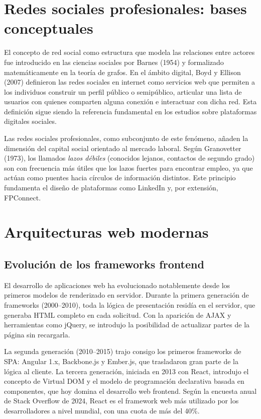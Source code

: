 \documentclass[a4paper]{report}
\begin{document}
\section{Redes sociales profesionales: bases conceptuales}

El concepto de red social como estructura que modela las relaciones entre actores fue introducido en las ciencias sociales por Barnes (1954) y formalizado matemáticamente en la teoría de grafos. En el ámbito digital, Boyd y Ellison (2007) definieron las redes sociales en internet como servicios web que permiten a los individuos construir un perfil público o semipúblico, articular una lista de usuarios con quienes comparten alguna conexión e interactuar con dicha red. Esta definición sigue siendo la referencia fundamental en los estudios sobre plataformas digitales sociales.

Las redes sociales profesionales, como subconjunto de este fenómeno, añaden la dimensión del capital social orientado al mercado laboral. Según Granovetter (1973), los llamados \textit{lazos débiles} (conocidos lejanos, contactos de segundo grado) son con frecuencia más útiles que los lazos fuertes para encontrar empleo, ya que actúan como puentes hacia círculos de información distintos. Este principio fundamenta el diseño de plataformas como LinkedIn y, por extensión, FPConnect.

\section{Arquitecturas web modernas}

\subsection{Evolución de los frameworks frontend}

El desarrollo de aplicaciones web ha evolucionado notablemente desde los primeros modelos de renderizado en servidor. Durante la primera generación de frameworks (2000--2010), toda la lógica de presentación residía en el servidor, que generaba HTML completo en cada solicitud. Con la aparición de AJAX y herramientas como jQuery, se introdujo la posibilidad de actualizar partes de la página sin recargarla.

La segunda generación (2010--2015) trajo consigo los primeros frameworks de SPA: Angular 1.x, Backbone.js y Ember.js, que trasladaron gran parte de la lógica al cliente. La tercera generación, iniciada en 2013 con React, introdujo el concepto de Virtual DOM y el modelo de programación declarativa basada en componentes, que hoy domina el desarrollo web frontend. Según la encuesta anual de Stack Overflow de 2024, React es el framework web más utilizado por los desarrolladores a nivel mundial, con una cuota de más del 40\%.
\end{document}
